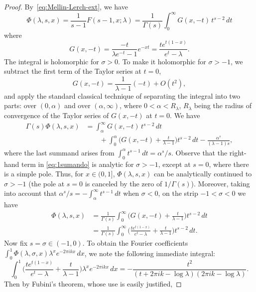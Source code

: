 \documentclass[11pt,a4paper]{amsart}
\theoremstyle{plain}
\theoremstyle{plain}
\theoremstyle{plain}
\theoremstyle{remark}
\begin{document}
\begin{proof}
By~\eqref{eq:Mellin-Lerch-ext}, we have
\[
  \Phi(\lambda,s,x) = \frac{1}{s-1}F(s-1,x;\lambda)
  = \frac{1}{\Gamma(s)} \int_0^\infty G(x,-t)\,t^{s-2}\,dt
\]
where
\[
  G(x,-t) = \frac{-t}{\lambda e^{-t}-1}e^{-xt} = \frac{te^{t(1-x)}}{e^t-\lambda}.
\]
The integral is holomorphic for $\sigma>0$. To make it holomorphic for $\sigma>-1$, we subtract the first term of the Taylor series at $t=0$,
\[
  G(x,-t) = \frac{1}{\lambda-1}(-t)+O(t^2),
\]
and apply the standard classical technique of separating the integral into two parts: over $(0,\alpha)$ and over $(\alpha,\infty)$, where $0<\alpha<R_\lambda$, $R_\lambda$ being the radius of convergence of the Taylor series of $G(x,-t)$ at $t=0$. We have
\begin{equation}
\label{eq:1sumando}
\begin{aligned}
  \Gamma(s) \Phi(\lambda,s,x)
  &= \int_\alpha^\infty G(x,-t)\,t^{s-2}\,dt \\
  &\qquad + \int_0^\alpha \Big(G(x,-t)+\frac{t}{\lambda-1}\Big)t^{s-2}\,dt
  - \frac{\alpha^s}{(\lambda-1)s},
\end{aligned}
\end{equation}
where the last summand arises from 
$\int_0^{\alpha} t^{s-1}\,dt = \alpha^s/s$. 
Observe that the right-hand term in \eqref{eq:1sumando} is analytic for $\sigma>-1$, except at $s=0$, where there is a simple pole. Thus, for $x\in (0,1]$, $\Phi(\lambda,s,x)$ can be analytically continued to $\sigma>-1$ (the pole at $s=0$ is  canceled by the zero of $1/\Gamma(s)$). Moreover, taking into account that
$\alpha^s/s = -\int_{\alpha}^{\infty} t^{s-1}\,dt$ when $\sigma < 0$, 
on the strip $-1<\sigma<0$ we have
\begin{align*}
  \Phi(\lambda,s,x) &= \frac{1}{\Gamma(s)} \int_0^\infty \Big(G(x,-t)+\frac{t}{\lambda-1}\Big) t^{s-2}\,dt
  \\
  &= \frac{1}{\Gamma(s)} \int_0^\infty \Big(\frac{te^{t(1-x)}}{e^t-\lambda} + \frac{t}{\lambda-1}\Big) t^{s-2}\,dt.
\end{align*}
Now fix $s=\sigma\in (-1,0)$. To obtain the Fourier coefficients 
$\int_0^1 \Phi(\lambda,\sigma,x)\lambda^x e^{-2\pi i kx} \,dx$, 
we note the following immediate integral:
\[
  \int_0^1 \Big(\frac{te^{t(1-x)}}{e^t-\lambda} + \frac{t}{\lambda-1}\Big) \lambda^x e^{-2\pi i kx} \,dx
= -\frac{t^2}{(t+2\pi i k-\log\lambda)(2\pi i k -\log\lambda)}.
  \]
Then by Fubini's theorem, whose use is easily justified,

\end{proof}
\end{document}
